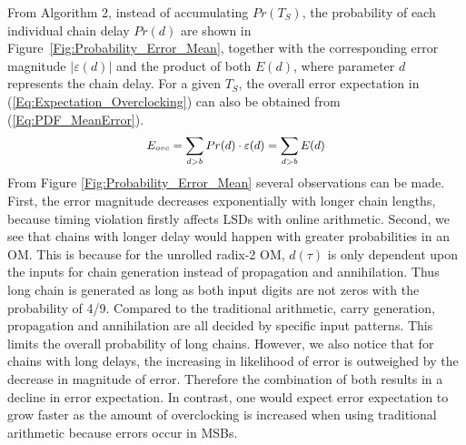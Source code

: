 \documentclass{acm_proc_article-sp}
\begin{document}
\vspace{-2ex}
From Algorithm 2, instead of accumulating $Pr(T_S)$, the probability of each individual chain delay $Pr(d)$ are shown in Figure~\ref{Fig:Probability_Error_Mean}, together with the corresponding error magnitude $|\varepsilon(d)|$ and the product of both $E(d)$, where parameter $d$ represents the chain delay. For a given $T_S$, the overall error expectation in (\ref{Eq:Expectation_Overclocking}) can also be obtained from (\ref{Eq:PDF_MeanError}).
%
%
\begin{eqnarray}\label{Eq:PDF_MeanError}
\scriptsize
  E_{ovc}=\sum_{d>b}Pr(d)\cdot\varepsilon(d)=\sum_{d>b}E(d)
\normalsize
\end{eqnarray}
%
From Figure \ref{Fig:Probability_Error_Mean} several observations can be made. First, the error magnitude decreases exponentially with longer chain lengths, because timing violation firstly affects LSDs with online arithmetic. Second, we see that chains with longer delay would happen with greater probabilities in an OM. This is because for the unrolled radix-2 OM, $d(\tau)$ is only dependent upon the inputs for chain generation instead of propagation and annihilation. Thus long chain is generated as long as both input digits are not zeros with the probability of 4/9. Compared to the traditional arithmetic, carry generation, propagation and annihilation are all decided by specific input patterns. This limits the overall probability of long chains. However, we also notice that for chains with long delays, the increasing in likelihood of error is outweighed by the decrease in magnitude of error. Therefore the combination of both results in a decline in error expectation. In contrast, one would expect error expectation to grow faster as the amount of overclocking is increased when using traditional arithmetic because errors occur in MSBs.

\end{document}
